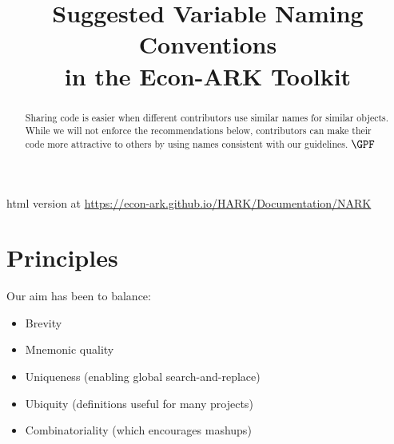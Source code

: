 \documentclass[12pt]{\econtex}
\begin{document}
\title{Suggested Variable Naming Conventions \\ in the Econ-ARK Toolkit}


\vspace{2in}


\maketitle 

\begin{abstract}
  Sharing code is easier when different contributors use similar names for similar objects.  While we will not enforce the recommendations below, contributors can make their code more attractive to others by using names consistent with our guidelines.
  $\GPF$
\end{abstract}

\centerline{html version at \url{https://econ-ark.github.io/HARK/Documentation/NARK}}



\pagebreak

\section{Principles}
Our aim has been to balance:
\begin{itemize}
\item Brevity 
\item Mnemonic quality
\item Uniqueness (enabling global search-and-replace)
\item Ubiquity (definitions useful for many projects)
\item Combinatoriality (which encourages mashups)
\end{itemize}
\end{document}
